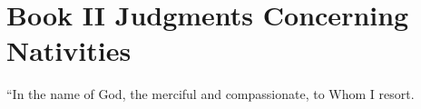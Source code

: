 \chapter{Book II Judgments Concerning Nativities}
``In the name of God, the merciful and compassionate, to Whom I resort.